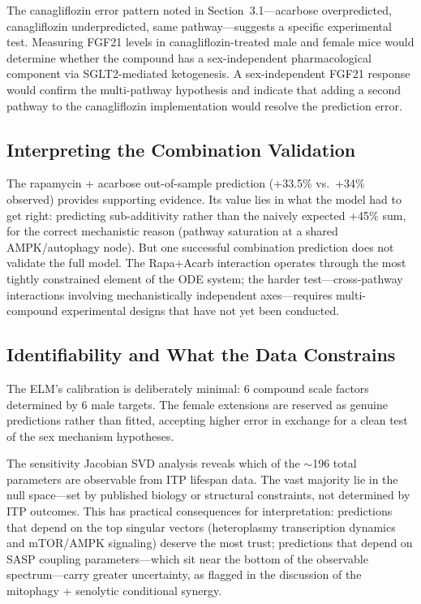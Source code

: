 \documentclass[11pt]{article}
\begin{document}
The canagliflozin error pattern noted in Section~3.1---acarbose overpredicted, canagliflozin underpredicted, same pathway---suggests a specific experimental test. Measuring FGF21 levels in canagliflozin-treated male and female mice would determine whether the compound has a sex-independent pharmacological component via SGLT2-mediated ketogenesis. A sex-independent FGF21 response would confirm the multi-pathway hypothesis and indicate that adding a second pathway to the canagliflozin implementation would resolve the prediction error.

\subsection{Interpreting the Combination Validation}

The rapamycin + acarbose out-of-sample prediction (+33.5\% vs.\ +34\% observed) provides supporting evidence. Its value lies in what the model had to get right: predicting sub-additivity rather than the naively expected +45\% sum, for the correct mechanistic reason (pathway saturation at a shared AMPK/autophagy node). But one successful combination prediction does not validate the full model. The Rapa+Acarb interaction operates through the most tightly constrained element of the ODE system; the harder test---cross-pathway interactions involving mechanistically independent axes---requires multi-compound experimental designs that have not yet been conducted.

\subsection{Identifiability and What the Data Constrains}

The ELM's calibration is deliberately minimal: 6 compound scale factors determined by 6 male targets. The female extensions are reserved as genuine predictions rather than fitted, accepting higher error in exchange for a clean test of the sex mechanism hypotheses.

The sensitivity Jacobian SVD analysis reveals which of the $\sim$196 total parameters are observable from ITP lifespan data. The vast majority lie in the null space---set by published biology or structural constraints, not determined by ITP outcomes. This has practical consequences for interpretation: predictions that depend on the top singular vectors (heteroplasmy transcription dynamics and mTOR/AMPK signaling) deserve the most trust; predictions that depend on SASP coupling parameters---which sit near the bottom of the observable spectrum---carry greater uncertainty, as flagged in the discussion of the mitophagy + senolytic conditional synergy.
\end{document}
